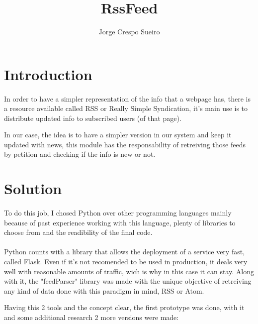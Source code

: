\documentclass{article}
\title{RssFeed}
\begin{document}
\author{Jorge Crespo Sueiro}
\maketitle
\tableofcontents
\listoffigures
\newpage

\section{Introduction}
\paragraph{}
\paragraph{}
In order to have a simpler representation of the info that a webpage has, there is a resource available called RSS or Really Simple Syndication, it's main use is to distribute updated info to subscribed users (of that page).

In our case, the idea is to have a simpler version in our system and keep it updated with news, this module has the responsability of retreiving those feeds by petition and checking if the info is new or not.

\section{Solution}
\paragraph{} 
To do this job, I chosed Python over other programming languages mainly because of past experience working with this language, plenty of libraries to choose from and the readibility of the final code.
\paragraph{}
Python counts with a library that allows the deployment of a service very fast, called Flask. Even if it's not recomended to be used in production, it deals very well with reasonable amounts of traffic, wich is why in this case it can stay.
Along with it, the "feedParser" library was made with the unique objective of retreiving any kind of data done with this paradigm in mind, RSS or Atom.

Having this 2 tools and the concept clear, the first prototype was done, with it and some additional research 2 more versions were made:
\end{document}
